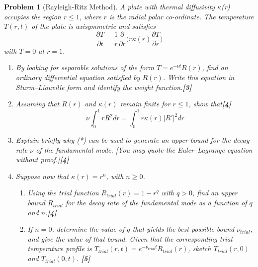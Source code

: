 \documentclass[a4paper]{article}
\theoremstyle{new}
\newtheorem{qns}{Problem}[section]
\begin{document}
\newpage
\begin{qns}[Rayleigh-Ritz Method]
A plate with thermal diffusivity $\kappa$(r) occupies the region $r\leq 1$, where $r$ is the radial
polar co-ordinate. The temperature $T(r, t)$ of the plate is axisymmetric and satisfies
$$\frac{\partial T}{\partial t}=\frac{1}{r}\frac{\partial}{\partial r}\bigg(r\kappa(r)\frac{\partial T}{\partial r}\bigg)$$
with $T = 0$ at $r = 1$.
\begin{enumerate}[label=(\alph*)]
\item By looking for separable solutions of the form $T=e^{-\nu t}R(r)$, find an ordinary differential equation satisfied by $R(r)$. Write this equation in Sturm–Liouville form and identify the weight function.\hfill\textbf{[3]}
\item Assuming that $R(r)$ and $\kappa(r)$ remain finite for $r\leq 1$, show that\hfill\textbf{[4]}
\begin{equation}
    \nu\int_0^1rR^2dr=\int_0^1r\kappa(r)|R'|^2dr\tag{*}
\end{equation}
\item Explain briefly why (*) can be used to generate an upper bound for the decay rate $\nu$ of the fundamental mode. [You may quote the Euler–Lagrange equation without proof.]\hfill\textbf{[4]}
\item Suppose now that $\kappa(r) = r^n$, with $n\geq0$.
\begin{enumerate}[label=(\roman*)]
\item Using the trial function $R_{trial}(r) = 1 − r^q$ with $q > 0$, find an upper bound $R_{trial}$ for the decay rate of the fundamental mode as a function of $q$ and $n$.\hfill\textbf{[4]}
\item
If $n = 0$, determine the value of $q$ that yields the best possible bound $\nu_{trial}$, and give the value of that bound. Given that the corresponding trial temperature profile is $T_{trial}(r, t) = e^{−\nu_{trial}t}R_{trial}(r)$, sketch $T_{trial}(r, 0)$ and $T_{trial}(0, t)$. \hfill\textbf{[5]}
\end{enumerate}
\end{enumerate}
\end{qns}
\end{document}
